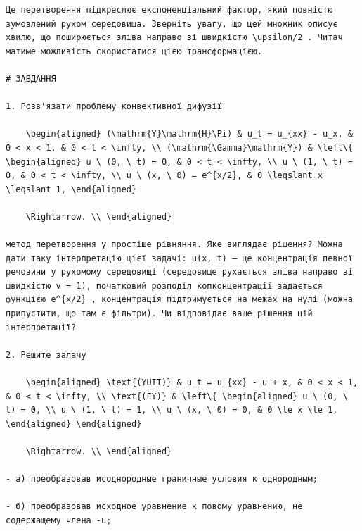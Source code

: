 \documentclass[
  ukrainian,
]{article}
\begin{document}
\begin{verbatim}
Це перетворення підкреслює експоненціальний фактор, який повністю зумовлений рухом середовища. Зверніть увагу, що цей множник описує хвилю, що поширюється зліва направо зі швидкістю \upsilon/2 . Читач матиме можливість скористатися цією трансформацією.

# ЗАВДАННЯ

1. Розв'язати проблему конвективної дифузії

    \begin{aligned} (\mathrm{Y}\mathrm{H}\Pi) & u_t = u_{xx} - u_x, & 0 < x < 1, & 0 < t < \infty, \\ (\mathrm{\Gamma}\mathrm{Y}) & \left\{ \begin{aligned} u \ (0, \ t) = 0, & 0 < t < \infty, \\ u \ (1, \ t) = 0, & 0 < t < \infty, \\ u \ (x, \ 0) = e^{x/2}, & 0 \leqslant x \leqslant 1, \end{aligned}

    \Rightarrow. \\ \end{aligned}

метод перетворення у простіше рівняння. Яке виглядає рішення? Можна дати таку інтерпретацію цієї задачі: u(x, t) — це концентрація певної речовини у рухомому середовищі (середовище рухається зліва направо зі швидкістю v = 1), початковий розподіл копконцентрації задається функцією e^{x/2} , концентрація підтримується на межах на нулі (можна припустити, що там є фільтри). Чи відповідає ваше рішення цій інтерпретації?

2. Решите залачу

    \begin{aligned} \text{(YUII)} & u_t = u_{xx} - u + x, & 0 < x < 1, & 0 < t < \infty, \\ \text{(FY)} & \left\{ \begin{aligned} u \ (0, \ t) = 0, \\ u \ (1, \ t) = 1, \\ u \ (x, \ 0) = 0, & 0 \le x \le 1, \end{aligned} \end{aligned}

    \Rightarrow. \\ \end{aligned}

- а) преобразовав исоднородные граничные условия к однородным;

- б) преобразовав исходное уравнение к повому уравнению, не содержащему члена -u;


\end{verbatim}
\end{document}
